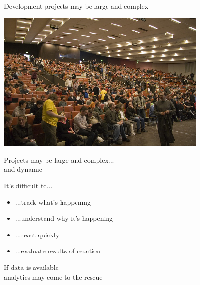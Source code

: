 \documentclass[17pt,aspectratio=169,hyperref=pdfusetitle]{beamer}
\begin{document}
\begin{frame}
Development projects may be large and complex

\begin{center}
\includegraphics[height=7cm]{figs/fosdem-crowd}
\end{center}

\end{frame}


\begin{frame}
\begin{flushright}
  Projects may be large and complex... \\
  and dynamic \\
\end{flushright}

It's difficult to... \

\begin{itemize}
\item ...track what's happening
\item ...understand why it's happening
\item ...react quickly
\item ...evaluate results of reaction 
\end{itemize}

\vspace{.2cm}

\begin{flushright}
If data is available\\
analytics may come to the rescue\\
\end{flushright}

\end{frame}

\end{document}
